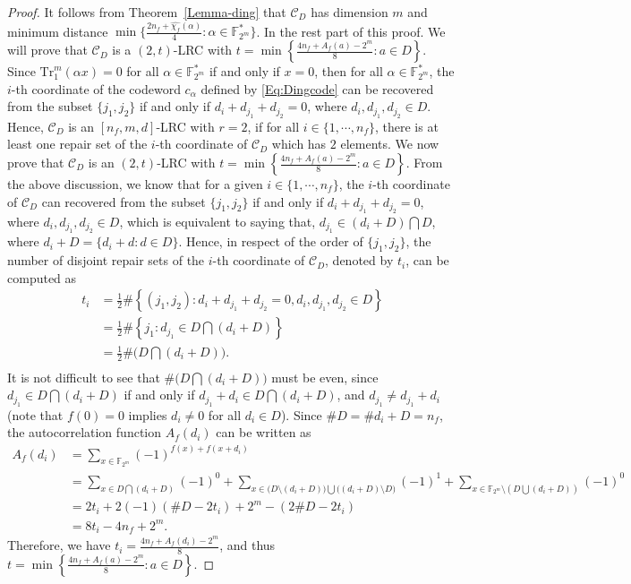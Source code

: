 \documentclass[10pt]{article}
\newcommand{\F}{\mathbb{F}}
\newcommand{\0}{\textbf{0}}
\newcommand{\1}{\textbf{1}}
\newcommand{\C}{{\mathcal C}}
\newcommand{\W}[2][]{\widehat{\chi_{#2}}^{#1}}
\begin{document}
\begin{proof}
It follows from Theorem~\ref{Lemma-ding} that $\C_D$ has dimension $m$ and minimum distance $\min\{\frac{2n_f+\W f(\alpha)}{4} : \alpha\in\F_{2^m}^*\}$.
In the rest part of this proof. We will prove that $\C_D$ is a $(2,t)$-LRC with $t=\min\left\{\frac{4n_f+A_f(a)-2^m}{8} : a\in D\right\}$.
    Since $\mathrm{Tr}_1^m(\alpha x)=0$ for all $\alpha\in \F_{2^m}^*$ if and only if $x=0$, then for all $\alpha\in \F_{2^m}^*$, the $i$-th coordinate of the codeword $c_{\alpha}$ defined by \eqref{Eq:Dingcode} can be recovered from the subset $\{j_1,j_2\}$ if and only if $d_i+d_{j_1}+d_{j_2}=0$, where $d_i, d_{j_1}, d_{j_2}\in D$.
    Hence, $\C_D$ is an $[n_f, m, d]$-LRC with $r=2$, if for all $i\in \{1,\cdots, n_f\}$, there is at least one repair set of the $i$-th coordinate of $\C_D$ which has $2$ elements. We now prove that $\C_D$ is an $(2,t)$-LRC with $t=\min\left\{\frac{4n_f+A_f(a)-2^m}{8}: a\in D\right\}$.
    From the above discussion, we know that for a given $i\in \{1,\cdots, n_f\}$,
    the $i$-th coordinate of $\C_D$ can recovered from the subset $\{j_1,j_2\}$ if and only if  $d_i+d_{j_1}+d_{j_2}=0$, where $d_i, d_{j_1}, d_{j_2}\in D$, which is equivalent to saying that, $d_{j_1}\in \left(d_i+D\right)\bigcap D$, where $d_i+D=\{d_i+d: d\in D\}$.
    Hence, in respect of the order of $\{j_1,j_2\}$,
    the number of disjoint repair sets of the $i$-th coordinate of $\C_D$, denoted by $t_i$, can be computed as
    \begin{align*}
        t_i&=\frac{1}{2}\#\left\{(j_1,j_2): d_i+d_{j_1}+d_{j_2}=0, d_i, d_{j_1}, d_{j_2}\in D\right\}\\
           &=\frac{1}{2}\#\left\{j_1: d_{j_1}\in D\bigcap (d_i+D) \right\} \\
           &=\frac{1}{2}\# \Big(D\bigcap (d_i+D)\Big).\\
    \end{align*}
    It is  not difficult  to see that $\#\Big(D \bigcap \left(d_i+D\right)\Big)$ must be even, since $d_{j_1}\in D\bigcap \left(d_i+D\right)$ if and only if
    $d_{j_1}+d_i\in D\bigcap \left(d_i+D\right)$, and $d_{j_1}\ne d_{j_1}+d_i$ (note that $f(0)=0$ implies $d_i\ne 0$ for all $d_i\in D$).
    Since $\#D=\#d_i+D=n_f$, the autocorrelation function $A_f(d_i)$ can be written as
    \begin{align*}
        A_f(d_i)&=\sum_{x\in\F_{2^m}}(-1)^{f(x)+f(x+d_i)}\\
                &=\sum_{x\in D\bigcap (d_i+D)}(-1)^{0}
                   +\sum_{x\in \big(D\setminus (d_i+D)\big)\bigcup \big((d_i+D)\setminus D\big)}(-1)^1
                   +\sum_{x\in \F_{2^m}\setminus (D\bigcup (d_i+D))}(-1)^{0}\\
                &=2t_i+2(-1)(\#D-2t_i)+2^m-(2\#D-2t_i)\\
                &=8t_i-4n_f+2^m.
    \end{align*}
    Therefore, we have $t_i=\frac{4n_f+A_f(d_i)-2^m}{8}$, and thus $t=\min\left\{\frac{4n_f+A_f(a)-2^m}{8} : a\in D\right\}$.
\end{proof}
\end{document}
